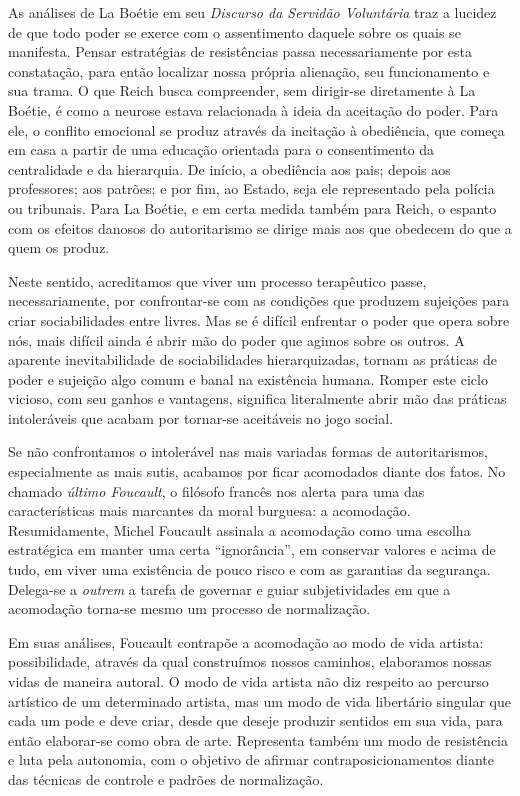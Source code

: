 As análises de La Boétie em seu \emph{Discurso da Servidão Voluntária}
traz a lucidez de que todo poder se exerce com o assentimento daquele
sobre os quais se manifesta. Pensar estratégias de resistências passa
necessariamente por esta constatação, para então localizar nossa própria
alienação, seu funcionamento e sua trama. O que Reich busca compreender,
sem dirigir-se diretamente à La Boétie, é como a neurose estava
relacionada à ideia da aceitação do poder. Para ele, o conflito
emocional se produz através da incitação à obediência, que começa em
casa a partir de uma educação orientada para o consentimento da
centralidade e da hierarquia. De início, a obediência aos pais; depois
aos professores; aos patrões; e por fim, ao Estado, seja ele
representado pela polícia ou tribunais. Para La Boétie, e em certa
medida também para Reich, o espanto com os efeitos danosos do
autoritarismo se dirige mais aos que obedecem do que a quem os produz.

Neste sentido, acreditamos que viver um processo terapêutico passe,
necessariamente, por confrontar-se com as condições que produzem
sujeições para criar sociabilidades entre livres. Mas se é difícil
enfrentar o poder que opera sobre nós, mais difícil ainda é abrir mão do
poder que agimos sobre os outros. A aparente inevitabilidade de
sociabilidades hierarquizadas, tornam as práticas de poder e sujeição
algo comum e banal na existência humana. Romper este ciclo vicioso, com
seu ganhos e vantagens, significa literalmente abrir mão das práticas
intoleráveis que acabam por tornar-se aceitáveis no jogo social.

Se não confrontamos o intolerável nas mais variadas formas de
autoritarismos, especialmente as mais sutis, acabamos por ficar
acomodados diante dos fatos. No chamado \emph{último Foucault}, o
filósofo francês nos alerta para uma das características mais marcantes
da moral burguesa: a acomodação. Resumidamente, Michel Foucault assinala
a acomodação como uma escolha estratégica em manter uma certa
``ignorância'', em conservar valores e acima de tudo, em viver uma
existência de pouco risco e com as garantias da segurança. Delega-se a
\emph{outrem} a tarefa de governar e guiar subjetividades em que a
acomodação torna-se mesmo um processo de normalização.

Em suas análises, Foucault contrapõe a acomodação ao modo de vida
artista: possibilidade, através da qual construímos nossos caminhos,
elaboramos nossas vidas de maneira autoral. O modo de vida artista não
diz respeito ao percurso artístico de um determinado artista, mas um
modo de vida libertário singular que cada um pode e deve criar, desde
que deseje produzir sentidos em sua vida, para então elaborar-se como
obra de arte. Representa também um modo de resistência e luta pela
autonomia, com o objetivo de afirmar contraposicionamentos diante das
técnicas de controle e padrões de normalização.


